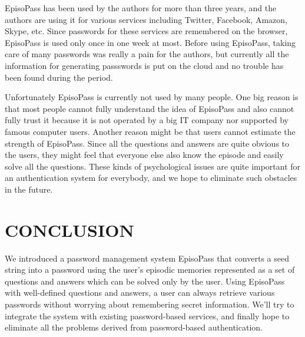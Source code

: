 \documentclass[runningheads,a4paper]{llncs}
\begin{document}
EpisoPass has been used by the authors for more than three years, and
the authors are using it for various services including
Twitter, Facebook, Amazon, Skype, etc.
Since passwords for these services are remembered on the browser,
EpisoPass is used only once in one week at most.
%
Before using EpisoPass, taking care of many passwords was really
a pain for the authors, but
currently all the information for generating passswords is put on the cloud
and no trouble has been found during the period.

Unfortunately EpisoPass is currently not used by many people.
One big reason is that most people cannot fully understand the
idea of EpisoPass and also cannot fully trust it
because it is not operated by a big IT company nor supported by
famous computer users.
Another reason might be that users cannot estimate the strength
of EpisoPass.
Since all the questions and answers are
quite obvious to the users,
they might feel that everyone else also know the episode
and easily solve all the questions.
These kinds of psychological issues are quite important for
an authentication system for everybody,
and we hope to eliminate such obstacles in the future.

\section{CONCLUSION}

We introduced a password management system EpisoPass
that converts a seed string into a password using the user's
episodic memories represented as a set of questions and answers
which can be solved only by the user.
%
Using EpisoPass with well-defined questions and answers,
a user can always retrieve various passwords without worrying about
remembering secret information.
%
We'll try to integrate the system with existing password-based
services, and finally hope to eliminate all the problems
derived from password-based authentication.

%
%
\end{document}
